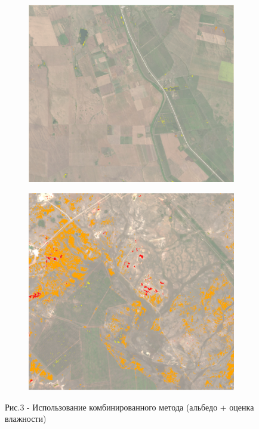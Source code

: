 \begin{figure}[H]
   \centering
   \begin{subfigure}{0.45\textwidth}
   	\centering
   	\includegraphics[width=\textwidth,height=0.75\textwidth]{media/ict/image35}
   \end{subfigure}
   \begin{subfigure}{0.45\textwidth}
   	\centering
   	\includegraphics[width=\textwidth,height=0.75\textwidth]{media/ict/image36}
   \end{subfigure}
   \caption*{Рис.3 - Использование комбинированного метода (альбедо + оценка влажности)}
\end{figure}

